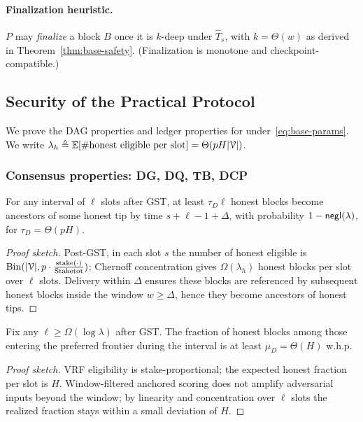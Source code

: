 \paragraph{Finalization heuristic.}
$P$ may \emph{finalize} a block $B$ once it is $k$-deep under $\hat T_s$, with $k=\Theta(w)$ as derived in Theorem~\ref{thm:base-safety}. (Finalization is monotone and checkpoint-compatible.)

\subsection{Security of the Practical Protocol}
\label{subsec:base-security}
We prove the DAG properties and ledger properties for \ProjBase under~\eqref{eq:base-params}. We write $\lambda_h \triangleq \mathbb{E}[\#\text{honest eligible per slot}]=\Theta(pH|\mathcal{V}|)$.

\subsubsection{Consensus properties: DG, DQ, TB, DCP}
\begin{theorem}
\label{thm:base-DG}
For any interval of $\ell$ slots after GST, at least $\tau_D\ell$ honest blocks become ancestors of some honest tip by time $s{+}\ell{-}1{+}\Delta$, with probability $1-\mathsf{negl}(\lambda)$, for $\tau_D=\Theta(pH)$.
\end{theorem}
\begin{proof}[Proof sketch]
Post-GST, in each slot $s$ the number of honest eligible is $\mathrm{Bin}(|\mathcal{V}|,p\cdot \frac{\mathrm{stake}(\cdot)}{\mathrm{Stake}{\mathrm{tot}}})$; Chernoff concentration gives $\Omega(\lambda_h)$ honest blocks per slot over $\ell$ slots. Delivery within $\Delta$ ensures these blocks are referenced by subsequent honest blocks inside the window $w\ge \Delta$, hence they become ancestors of honest tips.
\end{proof}

\begin{theorem}
\label{thm:base-DQ}
Fix any $\ell\ge \Omega(\log\lambda)$ after GST. The fraction of honest blocks among those entering the preferred frontier during the interval is at least $\mu_D=\Theta(H)$ w.h.p.
\end{theorem}
\begin{proof}[Proof sketch]
VRF eligibility is stake-proportional; the expected honest fraction per slot is $H$. Window-filtered anchored scoring does not amplify adversarial inputs beyond the window; by linearity and concentration over $\ell$ slots the realized fraction stays within a small deviation of $H$.
\end{proof}


